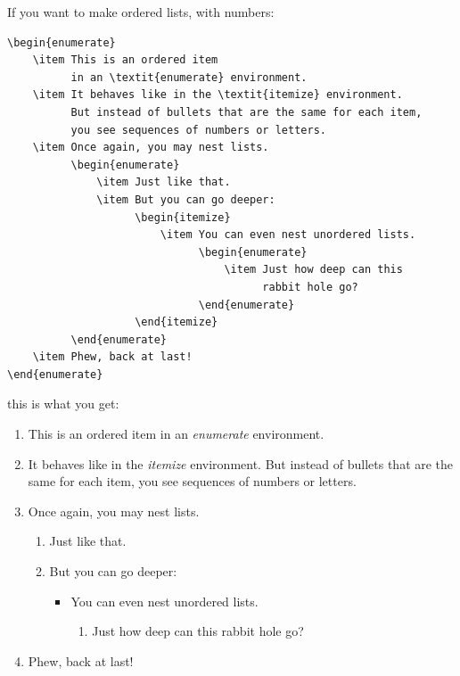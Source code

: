 \documentclass[en,inscr,ack,preface]{dimscthesis}
\begin{document}
If you want to make ordered lists, with numbers:
\begin{verbatim}
\begin{enumerate}
    \item This is an ordered item
          in an \textit{enumerate} environment.
    \item It behaves like in the \textit{itemize} environment.
          But instead of bullets that are the same for each item,
          you see sequences of numbers or letters.
    \item Once again, you may nest lists.
          \begin{enumerate}
              \item Just like that.
              \item But you can go deeper:
                    \begin{itemize}
                        \item You can even nest unordered lists.
                              \begin{enumerate}
                                  \item Just how deep can this
                                        rabbit hole go?
                              \end{enumerate}
                    \end{itemize}
          \end{enumerate}
    \item Phew, back at last!
\end{enumerate}
\end{verbatim}

this is what you get:
\begin{enumerate}
    \item This is an ordered item in an \textit{enumerate} environment.
    \item It behaves like in the \textit{itemize} environment.
    But instead of bullets that are the same for each item,
    you see sequences of numbers or letters.
    \item Once again, you may nest lists.
    \begin{enumerate}
        \item Just like that.
        \item But you can go deeper:
        \begin{itemize}
            \item You can even nest unordered lists.
            \begin{enumerate}
                \item Just how deep can this rabbit hole go?
            \end{enumerate}
        \end{itemize}
    \end{enumerate}
    \item Phew, back at last!
\end{enumerate}
\end{document}
